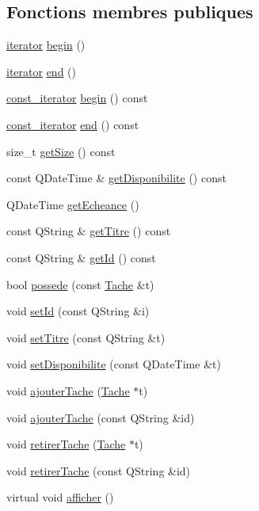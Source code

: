 \subsection*{Fonctions membres publiques}
\begin{DoxyCompactItemize}
\item 
\hyperlink{class_projet_1_1iterator}{iterator} \hyperlink{class_projet_a8d7cc0246df8b6929f4798b1024e208d}{begin} ()
\item 
\hyperlink{class_projet_1_1iterator}{iterator} \hyperlink{class_projet_a2aeb5e7db79a1240800d91b962c14ddf}{end} ()
\item 
\hyperlink{class_projet_1_1const__iterator}{const\+\_\+iterator} \hyperlink{class_projet_a16cb2ae4625deab305145f78db918e59}{begin} () const 
\item 
\hyperlink{class_projet_1_1const__iterator}{const\+\_\+iterator} \hyperlink{class_projet_ab24984c532525679fe3c0230b0686363}{end} () const 
\item 
size\+\_\+t \hyperlink{class_projet_aaa4fac44323bd319c740c1f1d285bfaa}{get\+Size} () const 
\item 
const Q\+Date\+Time \& \hyperlink{class_projet_a0deffe9e90675158ea636d346d454cc1}{get\+Disponibilite} () const 
\item 
Q\+Date\+Time \hyperlink{class_projet_aaf16b2ced20117743bee25d546f11f78}{get\+Echeance} ()
\item 
const Q\+String \& \hyperlink{class_projet_a917a74942a7c232849012687dad64b8e}{get\+Titre} () const 
\item 
const Q\+String \& \hyperlink{class_projet_a9a92a64fdf15130c72e3d4a9875467f0}{get\+Id} () const 
\item 
bool \hyperlink{class_projet_a42363da876b04e6028924fba9e2e86d8}{possede} (const \hyperlink{class_tache}{Tache} \&t)
\item 
void \hyperlink{class_projet_a5f325c588558b085ffacf51c48f06551}{set\+Id} (const Q\+String \&i)
\item 
void \hyperlink{class_projet_a1bc00f170040b45948f34b3ce7e0642b}{set\+Titre} (const Q\+String \&t)
\item 
void \hyperlink{class_projet_aba69d4166df2f8dc32e39913f2add7f2}{set\+Disponibilite} (const Q\+Date\+Time \&t)
\item 
void \hyperlink{class_projet_adf4f7c0f48ee4661b57be82af2b056ae}{ajouter\+Tache} (\hyperlink{class_tache}{Tache} $\ast$t)
\item 
void \hyperlink{class_projet_a65c346c033545bf02e08864c16ae2e8f}{ajouter\+Tache} (const Q\+String \&id)
\item 
void \hyperlink{class_projet_a3c0c1f9a620854878291c3e873a52f6e}{retirer\+Tache} (\hyperlink{class_tache}{Tache} $\ast$t)
\item 
void \hyperlink{class_projet_a9cc9037c1ee3ab49a1cbf3c153665f19}{retirer\+Tache} (const Q\+String \&id)
\item 
virtual void \hyperlink{class_projet_aff670a5010d70339cdce91773f7199a3}{afficher} ()
\end{DoxyCompactItemize}

